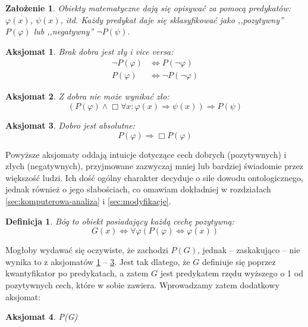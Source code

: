 \documentclass[
	runningheads
]{llncs}
\newtheorem{definition-pl}{Definicja}
\newtheorem{axiom-pl}{Aksjomat}
\newtheorem{assumption-pl}{Założenie}
\begin{document}
\begin{assumption-pl}
	Obiekty matematyczne dają się opisywać za pomocą predykatów: $\varphi(x)$, $\psi(x)$, itd. Każdy predykat daje się sklasyfikować jako ,,pozytywny'' $P(\varphi)$ lub ,,negatywny'' $\neg P(\psi)$. 
\end{assumption-pl}
\begin{axiom-pl} \label{axiom:godel1}
	Brak dobra jest zły i vice versa: 
	\begin{align*}
	\neg P(\varphi) & \Leftrightarrow P(\neg \varphi) \\ 
	P(\varphi) & \Leftrightarrow \neg P( \neg \varphi )
	\end{align*}
\end{axiom-pl}
\begin{axiom-pl} \label{axiom:godel2}
	Z dobra nie może wynikać zło: 
	\begin{equation*}
	\left( P(\varphi) \wedge \Box \forall x: \varphi(x) \Rightarrow \psi(x) \right) \Rightarrow P(\psi)
	\end{equation*}
\end{axiom-pl}
\begin{axiom-pl} \label{axiom:godel3}
	Dobro jest absolutne:
	\begin{equation*}
	P(\varphi) \Rightarrow \Box P(\varphi)
	\end{equation*}
\end{axiom-pl}
\noindent Powyższe aksjomaty oddają intuicje dotyczące cech dobrych (pozytywnych) i złych (negatywnych), przyjmowane zazwyczaj mniej lub bardziej świadomie przez większość ludzi. Ich dość ogólny charakter decyduje o sile dowodu ontologicznego, jednak również o jego słabościach, co omawiam dokładniej w rozdziałach \ref{sec:komputerowa-analiza} i \ref{sec:modyfikacje}. 
\begin{definition-pl} \label{def:godel-god}
	Bóg to obiekt posiadający każdą cechę pozytywną: 
	\begin{equation*}
	G(x) \Leftrightarrow \forall \varphi \left( P(\varphi) \Leftrightarrow \varphi(x) \right)
	\end{equation*}
\end{definition-pl}
\noindent Mogłoby wydawać się oczywiste, że zachodzi $P(G)$, jednak -- zaskakująco -- nie wynika to z aksjomatów \ref{axiom:godel1} -- \ref{axiom:godel3}. Jest tak dlatego, że $G$ definiuje się poprzez kwantyfikator po predykatach, a zatem $G$ jest predykatem rzędu wyższego o 1 od pozytywnych cech, które w sobie zawiera. Wprowadzamy zatem dodatkowy aksjomat:
\begin{axiom-pl} \label{axiom:godel4}
	P(G)
\end{axiom-pl}
\end{document}
